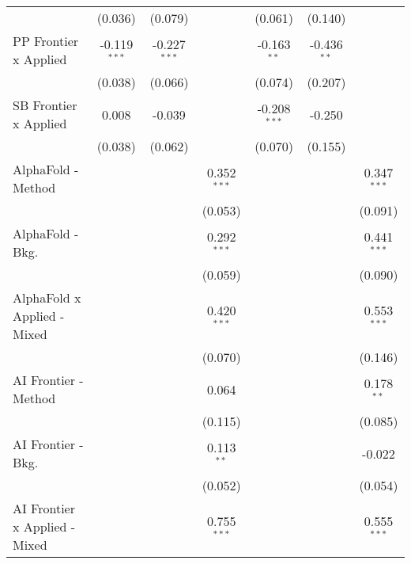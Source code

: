 \begin{tabular}{lcccccc}
                                  & (0.036)        & (0.079)        &                & (0.061)        & (0.140)       &   \\   
   PP Frontier x Applied          & -0.119$^{***}$ & -0.227$^{***}$ &                & -0.163$^{**}$  & -0.436$^{**}$ &   \\   
                                  & (0.038)        & (0.066)        &                & (0.074)        & (0.207)       &   \\   
   SB Frontier x Applied          & 0.008          & -0.039         &                & -0.208$^{***}$ & -0.250        &   \\   
                                  & (0.038)        & (0.062)        &                & (0.070)        & (0.155)       &   \\   
   AlphaFold - Method             &                &                & 0.352$^{***}$  &                &               & 0.347$^{***}$\\   
                                  &                &                & (0.053)        &                &               & (0.091)\\   
   AlphaFold - Bkg.               &                &                & 0.292$^{***}$  &                &               & 0.441$^{***}$\\   
                                  &                &                & (0.059)        &                &               & (0.090)\\   
   AlphaFold x Applied - Mixed    &                &                & 0.420$^{***}$  &                &               & 0.553$^{***}$\\   
                                  &                &                & (0.070)        &                &               & (0.146)\\   
   AI Frontier - Method           &                &                & 0.064          &                &               & 0.178$^{**}$\\   
                                  &                &                & (0.115)        &                &               & (0.085)\\   
   AI Frontier - Bkg.             &                &                & 0.113$^{**}$   &                &               & -0.022\\   
                                  &                &                & (0.052)        &                &               & (0.054)\\   
   AI Frontier x Applied - Mixed  &                &                & 0.755$^{***}$  &                &               & 0.555$^{***}$\\   

\end{tabular}
